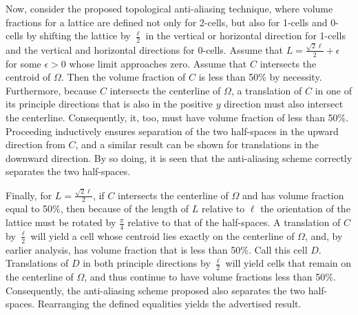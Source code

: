Now, consider the proposed topological anti-aliasing technique, where volume fractions for a lattice are defined not only for 2-cells, but also for 1-cells and 0-cells by shifting the lattice by $\frac{\ell}{2}$ in the vertical or horizontal direction for 1-cells and the vertical and horizontal directions for 0-cells.
Assume that $L = \frac{\sqrt{2}\ell}{2} + \epsilon$ for some $\epsilon>0$ whose limit approaches zero.
Assume that $C$ intersects the centroid of $\Omega$.
Then the volume fraction of $C$ is less than 50\% by necessity.
Furthermore, because $C$ intersects the centerline of $\Omega$, a translation of $C$ in one of its principle directions that is also in the positive $y$ direction must also intersect the centerline.
Consequently, it, too, must have volume fraction of less than 50\%.
Proceeding inductively ensures separation of the two half-spaces in the upward direction from $C$, and a similar result can be shown for translations in the downward direction.
By so doing, it is seen that the anti-aliasing scheme correctly separates the two half-spaces.

Finally, for $L = \frac{\sqrt{2}\ell}{2}$, if $C$ intersects the centerline of $\Omega$ and has volume fraction equal to 50\%,  then because of the length of $L$ relative to $\ell$ the orientation of the lattice must be rotated by $\frac{\pi}{4}$ relative to that of the half-spaces.
A translation of $C$ by $\frac{\ell}{2}$ will yield a cell whose centroid lies exactly on the centerline of $\Omega$, and, by earlier analysis, has volume fraction that is less than 50\%.
Call this cell $D$.
Translations of $D$ in both principle directions by $\frac{\ell}{2}$ will yield cells that remain on the centerline of $\Omega$, and thus continue to have volume fractions less than 50\%.
Consequently, the anti-aliasing scheme proposed also separates the two half-spaces.
Rearranging the defined equalities yields the advertised result.



